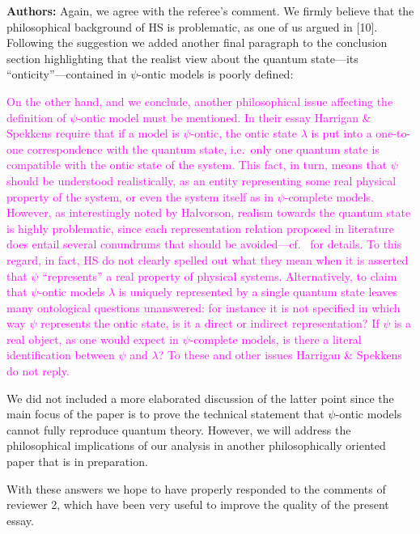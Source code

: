 \documentclass[11pt, executivepaper]{article}
\begin{document}
\begin{enumerate}
\textbf{Authors:} Again, we agree with the referee's comment. We firmly believe that the philosophical background of HS is problematic, as one of us argued in [10]. Following the suggestion we added another final paragraph to the conclusion section highlighting that the realist view about the quantum state---its ``onticity''---contained in $\psi$-ontic models is poorly defined:

\textcolor{magenta}{On the other hand, and we conclude, another philosophical issue affecting the definition of $\psi$-ontic model must be mentioned. In their essay Harrigan \& Spekkens require that if a model is $\psi$-ontic, the ontic state $\lambda$ is put into a  one-to-one correspondence with the quantum state, i.e.\ only one quantum state is compatible with the ontic state of the system. This fact, in turn, means that $\psi$ should be understood realistically, as an entity representing some real physical property of the system, or even the system itself as in $\psi$-complete models. However, as interestingly noted by Halvorson, realism towards the quantum state is highly problematic, since each representation relation proposed in literature does entail several conundrums that should be avoided---cf.\  \cite{Halvorson:2019} for details. To this regard, in fact, HS do not clearly spelled out what they mean when it is asserted that $\psi$ ``represents'' a real property of physical systems. Alternatively, to claim that $\psi$-ontic models $\lambda$ is uniquely represented by a single quantum state leaves many ontological questions unanswered: for instance it is not specified in which way $\psi$ represents the ontic state, is it a direct or indirect representation? If $\psi$ is a real object, as one would expect in $\psi$-complete models, is there a literal identification between $\psi$ and $\lambda$? To these and other issues Harrigan \& Spekkens do not reply.} 

\noindent We did not included a more elaborated discussion of the latter point since the main focus of the paper is to prove the technical statement that $\psi$-ontic models cannot fully reproduce quantum theory. However, we will address the philosophical implications of our analysis in another philosophically oriented paper that is in preparation.  
\end{enumerate}



\noindent With these answers we hope to have properly responded to the comments of reviewer 2, which have been very useful to improve the quality of the present essay.

\clearpage


\end{document}
